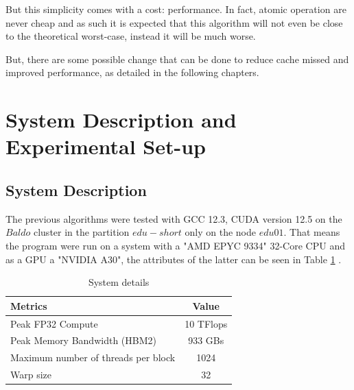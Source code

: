 \documentclass[conference]{IEEEtran}
\begin{document}
But this simplicity comes with a cost: performance. In fact, atomic operation are never cheap and as such it is expected that this algorithm will not even be close to the theoretical worst-case, instead it will be much worse.

But, there are some possible change that can be done to reduce cache missed and improved performance, as detailed in the following chapters.

\section{System Description and Experimental Set-up}

\subsection{System Description}
The previous algorithms were tested with GCC 12.3, CUDA version 12.5 on the $Baldo$ cluster in the partition $edu-short$ only on the node $edu01$. That means the program were run on a system with a "AMD EPYC 9334" 32-Core CPU and as a GPU a "NVIDIA A30", the attributes of the latter can be seen in Table \ref{tab:system_description} .

\begin{table}[htb!]
	\centering
	\begin{adjustbox}{width=0.8\columnwidth}
		\begin{tabular}{lc}
			\toprule
			\textbf{Metrics} &  \textbf{Value}  \\
			\midrule
			Peak FP32 Compute &  10 TFlops   \\
			Peak Memory Bandwidth (HBM2) & 933 GBs  \\
			Maximum number of threads per block & 1024 \\
			Warp size & 32 \\
			\bottomrule
		\end{tabular}
	\end{adjustbox}
	\vspace{1em}

	\caption{System details}
	\label{tab:system_description}
\end{table}
\end{document}
